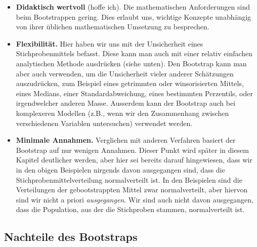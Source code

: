 \documentclass[oneside, 10pt]{book}\usepackage[]{graphicx}\usepackage[]{xcolor}
\begin{document}
\begin{itemize}
 \item \textbf{Didaktisch wertvoll} (hoffe ich).
 Die mathematischen Anforderungen sind beim Bootstrappen gering.
 Dies erlaubt uns, wichtige Konzepte unabhängig von ihrer üblichen
 mathematischen Umsetzung zu besprechen.

 \item \textbf{Flexibilität.} Hier haben wir uns mit der Unsicherheit eines
 Stichprobenmittels befasst. Diese kann man auch mit einer relativ
 einfachen analytischen Methode ausdrücken (siehe unten). Den Bootstrap
 kann man aber auch verwenden, um die Unsicherheit vieler anderer
 Schätzungen auszudrücken, zum Beispiel eines getrimmten
 oder winsorisierten Mittels, eines Medians,
 einer Standardabweichung, eines bestimmten
 Perzentils, oder irgendwelcher anderen Masse.
 Ausserdem kann der Bootstrap auch bei komplexeren Modellen
 (z.B., wenn wir den Zusammenhang zwischen verschiedenen Variablen untersuchen)
 verwendet werden.

 \item \textbf{Minimale Annahmen.} Verglichen mit anderen Verfahren basiert
 der Bootstrap auf nur wenigen Annahmen. Dieser Punkt wird später
 in diesem Kapitel deutlicher werden,
 aber hier sei bereits darauf
 hingewiesen, dass wir in den
 obigen Beispielen nirgends davon ausgegangen
 sind, dass die Stichprobenmittelverteilung normalverteilt ist.
 In den Beispielen sind die
 Verteilungen der gebootstrappten Mittel zwar
 normalverteilt, aber hiervon sind wir nicht a priori \emph{ausgegangen}.
 Wir sind auch nicht davon ausgegangen,
 dass die Population, aus der
 die Stichproben stammen, normalverteilt ist.
\end{itemize}


\subsection{Nachteile des Bootstraps}
\end{document}
